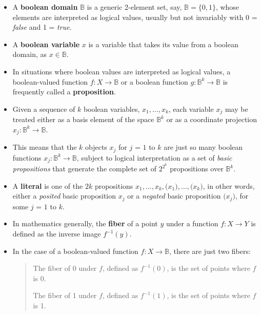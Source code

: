 \documentclass[12pt]{article}
\begin{document}
\begin{itemize}

\item
A \textbf{boolean domain} $\mathbb{B}$ is a generic 2-element set, say, $\mathbb{B} = \{ 0, 1 \}$, whose elements are interpreted as logical values, usually but not invariably with 0 = \textit{false} and 1 = \textit{true}.

\item
A \textbf{boolean variable} $x$ is a variable that takes its value from a boolean domain, as $x \in \mathbb{B}$.

\item
In situations where boolean values are interpreted as logical values, a boolean-valued function $f : X \to \mathbb{B}$ or a boolean function $g : \mathbb{B}^k \to \mathbb{B}$ is frequently called a \textbf{proposition}.

\item
Given a sequence of $k$ boolean variables, $x_1, \ldots, x_k$, each variable $x_j$ may be treated either as a basis element of the space $\mathbb{B}^k$ or as a coordinate projection $x_j : \mathbb{B}^k \to \mathbb{B}$.

\item
This means that the $k$ objects $x_j$ for $j$ = $1$ to $k$ are just so many boolean functions $x_j : \mathbb{B}^k \to \mathbb{B}$, subject to logical interpretation as a set of \textit{basic propositions} that generate the complete set of $2^{2^k}$ propositions over $\mathbb{B}^k$.

\item
A \textbf{literal} is one of the $2k$ propositions $x_1, \ldots, x_k, \texttt{(} x_1 \texttt{)}, \ldots, \texttt{(} x_k \texttt{)}$, in other words, either a \textit{posited} basic proposition $x_j$ or a \textit{negated} basic proposition $\texttt{(} x_j \texttt{)}$, for some $j$ = $1$ to $k$.

\item
In mathematics generally, the \textbf{fiber} of a point $y$ under a function $f : X \to Y$ is defined as the inverse image $f^{-1}(y)$.

\item
In the case of a boolean-valued function $f : X \to \mathbb{B}$, there are just two fibers:

\begin{quote}
The fiber of 0 under $f$, defined as $f^{-1}(0)$, is the set of points where $f$ is 0.

The fiber of 1 under $f$, defined as $f^{-1}(1)$, is the set of points where $f$ is 1.
\end{quote}


\end{itemize}
\end{document}
